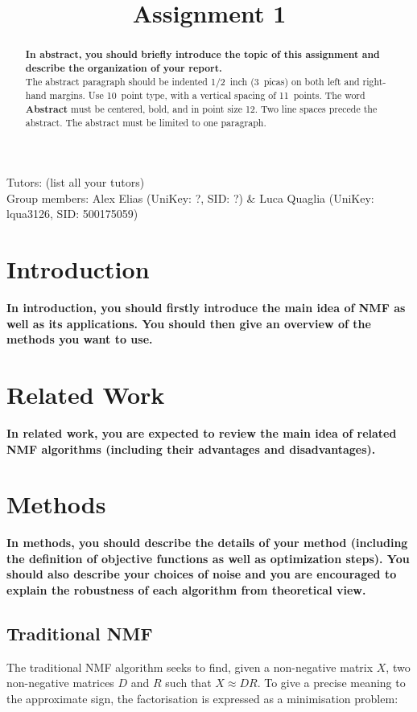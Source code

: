 \documentclass{article} %
\title{Assignment 1}
\begin{document}
\maketitle

Tutors: (list all your tutors)\\
Group members: Alex Elias (UniKey: ?, SID: ?) \& Luca Quaglia (UniKey: lqua3126, SID: 500175059)\\

\begin{abstract}
\textbf{In abstract, you should briefly introduce the topic of this assignment and describe the organization of your report.}\\

The abstract paragraph should be indented 1/2~inch (3~picas) on both left and
right-hand margins. Use 10~point type, with a vertical spacing of 11~points.
The word \textbf{Abstract} must be centered, bold, and in point size 12. Two
line spaces precede the abstract. The abstract must be limited to one
paragraph.
\end{abstract}

\section{Introduction}
\textbf{In introduction, you should firstly introduce the main idea of NMF as well as its applications. You should then give an overview of the methods you want to use.}

\section{Related Work}
\textbf{In related work, you are expected to review the main idea of related NMF algorithms (including their advantages and disadvantages).}

\section{Methods}
\textbf{In methods, you should describe the details of your method (including the definition of objective functions as well as optimization steps). You should also describe your choices of noise and you are encouraged to explain the robustness of each algorithm from theoretical view.}

\subsection{Traditional NMF}
The traditional NMF algorithm seeks to find, given a non-negative matrix $X$, two non-negative matrices $D$ and $R$ such that $X\approx DR$. To give a precise meaning to the approximate sign, the factorisation is expressed as a minimisation problem:
\end{document}
